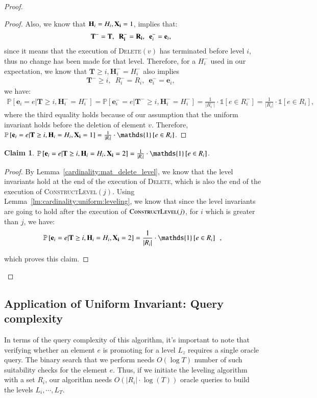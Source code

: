 \documentclass[11pt]{article}
\newtheorem{claim}{Claim}[section]
\renewcommand{\Pr}[1]{\ensuremath{\mathbb{P}\left[#1\right]}}
\newcommand{\ind}[1]{\ensuremath{\mathds{1}\left[#1\right]}}
\newcommand{\constLevel}{\textsc{ConstructLevel}}
\newcommand{\deletev}{{\textsc{Delete}}}
\newcommand{\bE}{\ensuremath{\mathbf{e}}}
\newcommand{\bT}{\ensuremath{\mathbf{T}}}
\newcommand{\bH}{\ensuremath{\mathbf{H}}}
\begin{document}
\begin{proof}
\begin{proof}
Also, we know that $\bH_i = H_i, \bold{X_i} = 1$, implies that: 
\begin{align*}
    \bT^- = \bT, \enspace
    \bold{R_i^-} = \bold{R_i}, \enspace
    \bE_i^- = \bE_i, \enspace
\end{align*}
since it means that the execution of \deletev$(v)$ has terminated before level $i$, thus no change has been made for that level.
Therefore, for a $H_i^-$ used in our expectation, we know that $\bT \geq i, \bH_i^- = H_i^-$ also implies 
\begin{align*}
    \bT^- \geq i, \enspace
    R_i^- = R_i, \enspace
    \bE_i^- = \bE_i, \enspace
\end{align*}
we have:
\begin{align*}
    \Pr{\bE_i = e | \bT \geq i, \bH_i^- = H_i^-} = \Pr{\bE_i^- = e | \bT^- \geq i, \bH_i^- = H_i^-} = \frac{1}{|R_i^{-}|} \cdot \ind{e \in R_i^{-}} = \frac{1}{|R_i|} \cdot \ind{e \in R_i}, 
\end{align*}
where the third equality holds because of our assumption that the uniform invariant holds before the deletion of element $v$.
Therefore, $\Pr{\bE_i = e | \bT \geq i, \bH_i = H_i, \bold{X_i} = 1} = \frac{1}{|R_i|} \cdot \ind{e \in R_i}$.
    
\end{proof}



\begin{claim}
\label{cardinality:sevomi}
    $\Pr{\bE_i = e | \bT \geq i, \bH_i = H_i, \bold{X_i} = 2}  = \frac{1}{|R_i|}\cdot \ind{e \in R_i}$.
\end{claim}

\begin{proof}
By Lemma~\ref{cardinality:mat_delete_level}, we know that the level invariants hold at the end of the execution of \deletev{}, which is also the end of the execution of \constLevel{$(j)$}. 
Using Lemma~\ref{lm:cardinality:uniform:leveling}, we know that 
since the level invariants are going to hold after the execution of $\constLevel{}(j)$, 
for $i$ which is greater than $j$, we have: 
$$\Pr{\bE_i = e | \bT \geq i, \bH_i = H_i, \bold{X_i} = 2}  = \frac{1}{|R_i|}\cdot \ind{e \in R_i} \enspace, $$

which proves this claim. 
\end{proof}

\end{proof}



\subsection{Application of Uniform Invariant: Query complexity}
In terms of the query complexity of this algorithm, it's important to note that verifying whether an element $e$ is promoting for a level $L_z$ requires a single oracle query.
The binary search that we perform needs $O(\log T)$ number of such suitability checks for the element $e$. 
Thus, if we initiate the leveling algorithm with a set $R_i$, 
our algorithm needs $O(|R_i|\cdot \log(T))$ oracle queries to build the levels $L_i,\cdots, L_T$. 
\end{document}

